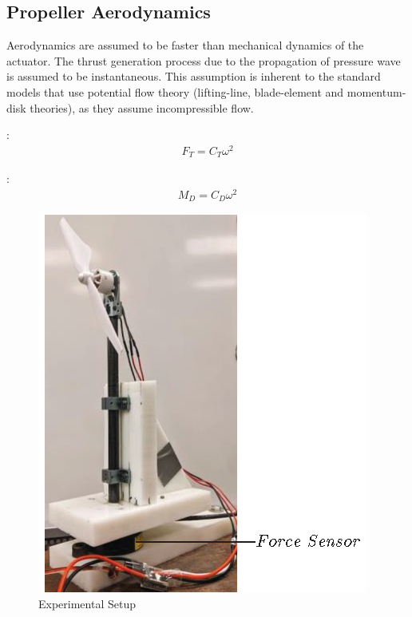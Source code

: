 \subsection{Propeller Aerodynamics}
Aerodynamics are assumed to be faster than mechanical dynamics of the actuator.
The thrust generation process due to the propagation of pressure wave is assumed to be instantaneous. This assumption is inherent to the standard models that use potential flow theory (lifting-line, blade-element and momentum-disk theories), as they assume incompressible flow.\\

\begin{minipage}{0.49\textwidth}
    :
    \begin{align*}
        F_T = C_{T} \omega^2
    \end{align*}

    :
    \begin{align*}
        M_D = C_{D} \omega^2
    \end{align*}
\end{minipage}
\begin{minipage}{0.49\textwidth}
    \begin{figure}[H]
        \centering
        \includegraphics[width = \textwidth]{figs/aero/expt_setup.eps}
        \caption{Experimental Setup}
        \label{fig:expt_setup}
    \end{figure}
\end{minipage}

